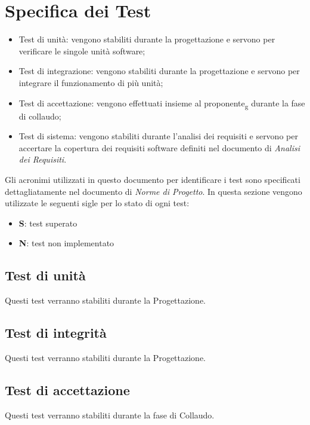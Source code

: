 \section{Specifica dei Test}
\begin{itemize}
\item Test di unità: vengono stabiliti durante la progettazione e servono per verificare le singole unità software;
\item Test di integrazione: vengono stabiliti durante la progettazione e servono per integrare il funzionamento di più unità;
\item Test di accettazione: vengono effettuati insieme al proponente\textsubscript{g} durante la fase di collaudo;
\item Test di sistema: vengono stabiliti durante l'analisi dei requisiti e servono per accertare la copertura dei requisiti software definiti nel documento di \textit{Analisi dei Requisiti}.
\end{itemize}
Gli acronimi utilizzati in questo documento per identificare i test sono specificati dettagliatamente nel documento di \textit{Norme di Progetto}.
In questa sezione vengono utilizzate le seguenti sigle per lo stato di ogni test:
\begin{itemize}
\item \textbf{S}: test superato
\item \textbf{N}: test non implementato
\end{itemize}

\subsection{Test di unità}
Questi test verranno stabiliti durante la Progettazione.

\subsection{Test di integrità}
Questi test verranno stabiliti durante la Progettazione.

\subsection{Test di accettazione}
Questi test verranno stabiliti durante la fase di Collaudo.

